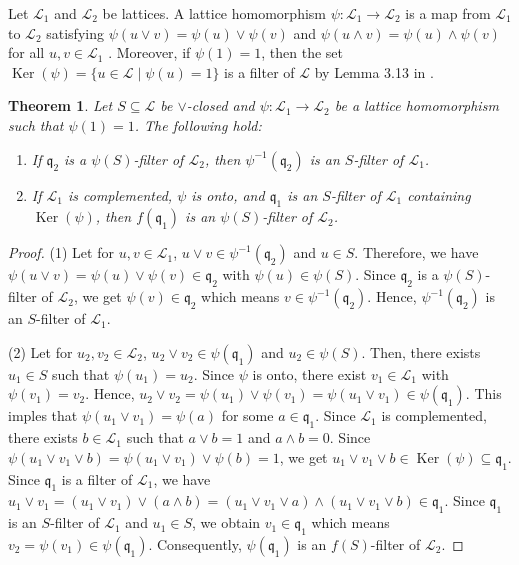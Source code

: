 \documentclass[preprint,review,10pt]{amsart}
\newtheorem{theorem}{Theorem}[section]
\theoremstyle{definition}
\theoremstyle{remark}
\numberwithin{equation}{section}
\begin{document}
Let $\mathscr{L}_1$ and $\mathscr{L}_2$ be lattices. A lattice homomorphism $\psi :\mathscr{L}_1 \rightarrow \mathscr{L}_2$ is a map from $\mathscr{L}_1$ to $\mathscr{L}_2$ satisfying $\psi(u \vee v) = \psi(u) \vee \psi(v)$ and $\psi(u \wedge v) = \psi(u) \wedge \psi(v)$ for all $u, v \in \mathscr{L}_1$  \cite{Birkhoff}. Moreover, if $\psi(1)=1$, then the set $\operatorname{Ker}(\psi)=\{u \in  \mathscr{L} \mid \psi(u)=1\}$ is a filter of $\mathscr{L}$ by Lemma 3.13 in \cite{Atani2}.
\begin{theorem} \label{homo}
Let $S \subseteq \mathscr{L}$  be   $\vee$-closed and $\psi :\mathscr{L}_1 \rightarrow \mathscr{L}_2$ be a lattice homomorphism such that $\psi(1) = 1$. The following hold:
 \begin{enumerate}
\item If $\mathfrak{q}_2$ is a $\psi(S)$-filter of  $\mathscr{L}_2$, then  $\psi^{-1}(\mathfrak{q}_2)$ is an $S$-filter of $\mathscr{L}_1$.
\item If $\mathscr{L}_1$ is   complemented, $\psi$ is onto, and $\mathfrak{q}_1$ is an $S$-filter of $\mathscr{L}_1$ containing $\operatorname{Ker}(\psi)$, then $f(\mathfrak{q}_1)$ is an $\psi(S)$-filter of $\mathscr{L}_2$.
 \end{enumerate}
\end{theorem}
\begin{proof}
(1) Let for $u,v \in \mathscr{L}_1$, $u \vee v \in \psi^{-1}(\mathfrak{q}_2)$  and $u \in S$. Therefore, we have $\psi(u \vee v)=\psi(u) \vee \psi(v) \in \mathfrak{q}_2$ with $\psi(u) \in \psi(S)$. Since $\mathfrak{q}_2$ is a $\psi(S)$-filter of  $\mathscr{L}_2$, we get $\psi(v) \in \mathfrak{q}_2$ which means $v \in \psi^{-1}(\mathfrak{q}_2)$. Hence, $\psi^{-1}(\mathfrak{q}_2)$ is an $S$-filter of $\mathscr{L}_1$.

(2) Let for $u_2,v_2 \in \mathscr{L}_2$, $u_2 \vee v_2 \in \psi(\mathfrak{q}_1)$  and $u_2 \in \psi(S)$. Then, there exists $u_1 \in S$ such that $\psi(u_1)=u_2$. Since $\psi$ is onto, there exist $v_1 \in \mathscr{L}_1$ with $\psi(v_1)=v_2$. Hence, $u_2 \vee v_2=\psi(u_1) \vee \psi(v_1)=\psi(u_1 \vee v_1) \in \psi(\mathfrak{q}_1) $. This imples that $\psi(u_1 \vee v_1)=\psi(a)$ for some $a \in \mathfrak{q}_1$. Since $\mathscr{L}_1$ is   complemented, there exists $b \in \mathscr{L}_1$ such that $a \vee b =1$ and $a \wedge b =0$. Since $\psi(u_1 \vee v_1 \vee b)=\psi(u_1 \vee v_1) \vee \psi(b)=1$, we get $u_1 \vee v_1 \vee b \in \operatorname{Ker}(\psi) \subseteq  \mathfrak{q}_1$. Since $\mathfrak{q}_1$ is a filter of $\mathscr{L}_1$, we have $u_1 \vee v_1=(u_1 \vee v_1) \vee (a \wedge b)=(u_1 \vee v_1 \vee a) \wedge (u_1 \vee v_1 \vee b) \in \mathfrak{q}_1$. Since $\mathfrak{q}_1$ is an $S$-filter of $\mathscr{L}_1$ and $u_1 \in S$, we obtain $v_1 \in \mathfrak{q}_1$ which means $v_2=\psi(v_1)  \in \psi(\mathfrak{q}_1)$. Consequently, $\psi(\mathfrak{q}_1)$ is an $f(S)$-filter of $\mathscr{L}_2$.
\end{proof}
\end{document}

